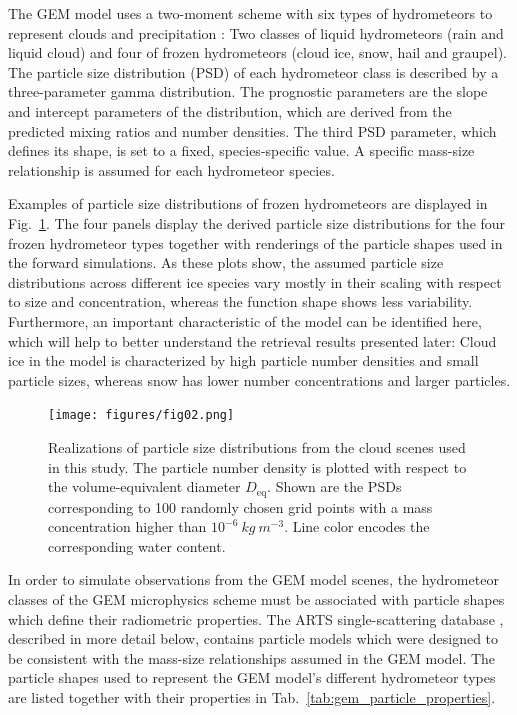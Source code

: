 \documentclass[journal abbreviation, manuscript]{copernicus}
\begin{document}
The GEM model uses a two-moment scheme with six types of hydrometeors to
represent clouds and precipitation \citep{milbrandtyau05}: Two classes of liquid
hydrometeors (rain and liquid cloud) and four of frozen hydrometeors (cloud ice,
snow, hail and graupel). The particle size distribution (PSD) of each
hydrometeor class is described by a three-parameter gamma distribution. The
prognostic parameters are the slope and intercept parameters of the
distribution, which are derived from the predicted mixing ratios and number
densities. The third PSD parameter, which defines its shape, is set to a fixed,
species-specific value. A specific mass-size relationship is assumed for each
hydrometeor species.

Examples of particle size distributions of frozen hydrometeors are displayed in
Fig.~\ref{fig:gem_psds}. The four panels display the derived particle size
distributions for the four frozen hydrometeor types together with renderings of
the particle shapes used in the forward simulations. As these plots show, the
assumed particle size distributions across different ice species vary mostly in
their scaling with respect to size and concentration, whereas the function shape
shows less variability. Furthermore, an important characteristic of the model
can be identified here, which will help to better understand the retrieval
results presented later: Cloud ice in the model is characterized by high
particle number densities and small particle sizes, whereas snow has lower
number concentrations and larger particles.


\begin{figure}[h!]
\centering \texttt{[image: figures/fig02.png]}
\caption{Realizations of particle size distributions from the cloud scenes used
  in this study. The particle number density is plotted with respect to the
  volume-equivalent diameter $D_\text{eq}$. Shown are the PSDs corresponding to
  100 randomly chosen grid points with a mass concentration higher than
  $10^{-6}\ \unit{kg\ m^{-3}}$. Line color encodes the corresponding water content.}
\label{fig:gem_psds}
\end{figure}

In order to simulate observations from the GEM model scenes, the hydrometeor
classes of the GEM microphysics scheme must be associated with particle shapes
which define their radiometric properties. The ARTS single-scattering database ,
described in more detail below, contains particle models which were designed to
be consistent with the mass-size relationships assumed in the GEM model. The
particle shapes used to represent the GEM model's different hydrometeor types
are listed together with their properties in
Tab.~\ref{tab:gem_particle_properties}.
\end{document}
